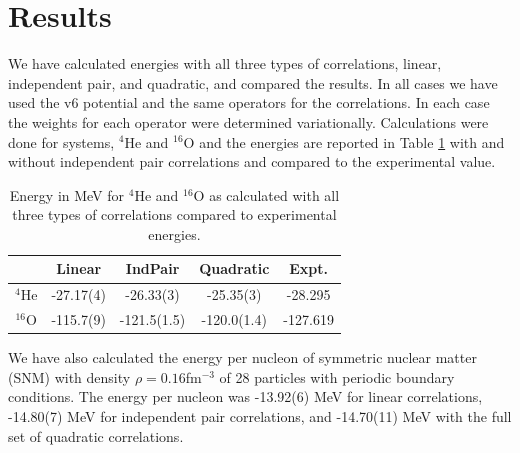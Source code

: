 \section{Results}
We have calculated energies with all three types of correlations, linear, independent pair, and quadratic, and compared the results. In all cases we have used the v6 potential and the same operators for the correlations. In each case the weights for each operator were determined variationally. Calculations were done for systems, $^4$He and $^{16}$O and the energies are reported in Table \ref{tab:indpairresults} with and without independent pair correlations and compared to the experimental value.

\begin{table}[h!]
   \centering
   \caption{Energy in MeV for $^4$He and $^{16}$O as calculated with all three types of correlations compared to experimental energies.}
   \label{tab:indpairresults}
   \begin{tabular}{ccccc}
      \hline \hline
       & Linear & IndPair & Quadratic & Expt.\\
      \hline
      $^4$He & -27.17(4) & -26.33(3) & -25.35(3) & -28.295\\
      $^{16}$O & -115.7(9) & -121.5(1.5) & -120.0(1.4) & -127.619\\
      \hline \hline
   \end{tabular}
\end{table}

We have also calculated the energy per nucleon of symmetric nuclear matter (SNM) with density $\rho=0.16$fm$^{-3}$ of 28 particles with periodic boundary conditions. The energy per nucleon was -13.92(6) MeV for linear correlations, -14.80(7) MeV for independent pair correlations, and -14.70(11) MeV with the full set of quadratic correlations.

